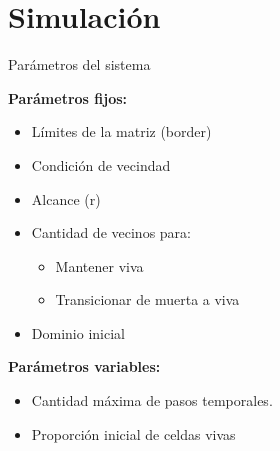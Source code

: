 \section{Simulación}

\begin{frame}{Parámetros del sistema}
    \begin{minipage}[t]{0.45\linewidth}

        {\textbf{Parámetros fijos:}
        \begin{itemize}
            \item Límites de la matriz (border)
            \item Condición de vecindad
            \item Alcance (r)
            \item Cantidad de vecinos para:
            \begin{itemize}
                \item Mantener viva
                \item Transicionar de muerta a viva
            \end{itemize}
            \item Dominio inicial
        \end{itemize}}
    \end{minipage}
    \begin{minipage}[t]{0.45\linewidth}
        \textbf{Parámetros variables:}
        \begin{itemize}
            \item Cantidad máxima de pasos temporales.
            \item Proporción inicial de celdas vivas
        \end{itemize}

    \end{minipage}
\end{frame}

